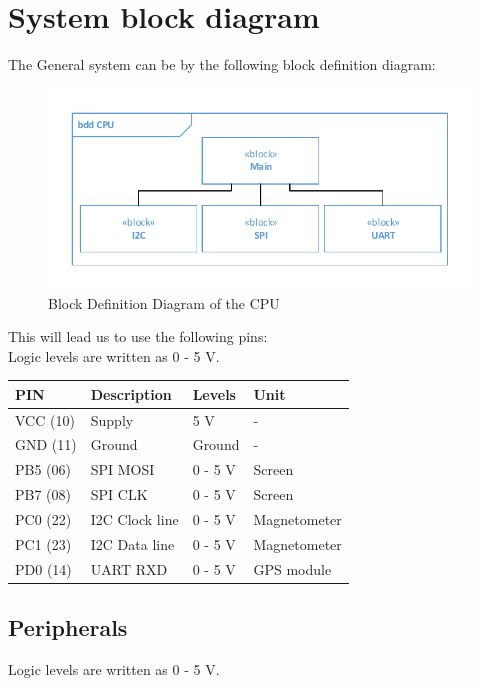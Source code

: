 \section{System block diagram}
The General system can be by the following block definition diagram:\\
\begin{figure}[H]
	\centering
	\includegraphics[width=.8\textwidth]{billeder/CPUBDD}
	\caption{Block Definition Diagram of the CPU}
	\label{bdd:system}
\end{figure}

This will lead us to use the following pins:\\
Logic levels are written as 0 - 5 V.\\

\begin{table}[H]
\centering
    \begin{tabular}{|l|l|l|l|}
    \hline
    PIN 		& Description    & Levels 	& Unit  \\ \hline
    VCC (10) 	& Supply         & 5 V    	& -		\\ \hline
    GND (11) 	& Ground         & Ground  	& -		\\ \hline
    PB5	(06)	& SPI MOSI		 & 0 - 5 V  & Screen \\ \hline
    PB7 (08)	& SPI CLK		 & 0 - 5 V  & Screen \\ \hline
    PC0 (22) 	& I2C Clock line & 0 - 5 V 	& Magnetometer 	\\ \hline
    PC1 (23) 	& I2C Data line  & 0 - 5 V 	& Magnetometer		\\ \hline
    PD0 (14)	& UART RXD		 & 0 - 5 V	& GPS module \\ \hline
    \end{tabular}
\end{table}

\subsection{Peripherals}
Logic levels are written as 0 - 5 V.\\

